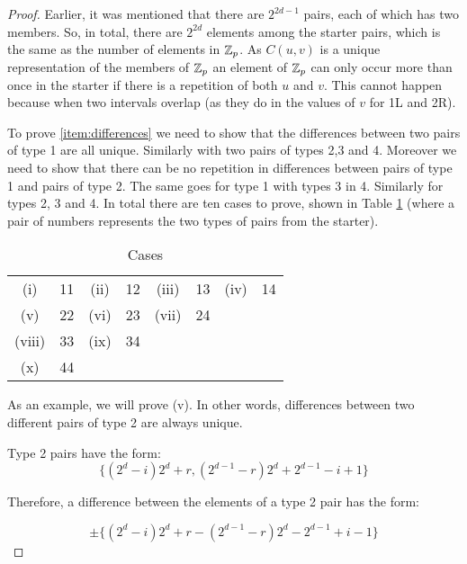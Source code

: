 \begin{proof}
Earlier, it was mentioned that there are $2^{2d - 1}$ pairs, each of which has two members.
So, in total, there are $2^{2d}$ elements among the starter pairs, which is the same as the number of elements in $\mathbb{Z}_{p}$.
As $C(u, v)$ is a unique representation of the members of $\mathbb{Z}_{p}$ an element of $\mathbb{Z}_{p}$ can only occur more than once in the starter if there is a repetition of both $u$ and $v$.
This cannot happen because when two intervals overlap (as they do in the values of $v$ for 1L and 2R).

To prove \ref{item:differences} we need to show that the differences between two pairs of type 1 are all unique.
Similarly with two pairs of types 2,3 and 4.
Moreover we need to show that there can be no repetition in differences between pairs of type 1 and pairs of type 2.
The same goes for type 1 with types 3 in 4.
Similarly for types 2, 3 and 4.
In total there are ten cases to prove, shown in Table \ref{tab:cases} (where a pair of numbers represents the two types of pairs from the starter).

\begin{table}[h!]
  \begin{center}
    \begin{tabular}{cccccccc}
      (i)    & 11 & (ii) & 12 & (iii) & 13 & (iv) & 14 \\
      (v)    & 22 & (vi) & 23 & (vii) & 24 &      &    \\
      (viii) & 33 & (ix) & 34 &       &    &      &    \\
      (x)    & 44 &      &    &       &    &      &    
    \end{tabular}
  \end{center}
  \caption{Cases}
  \label{tab:cases}
\end{table}

As an example, we will prove (v).
In other words, differences between two different pairs of type 2 are always unique.

Type 2 pairs have the form:
\begin{equation*}
\{(2^d - i)2^d + r, (2^{d - 1} - r)2^d + 2^{d - 1} - i + 1\}
\end{equation*}

Therefore, a difference between the elements of a type 2 pair has the form:

\begin{equation*}
  \pm \{(2^d - i)2^d + r - (2^{d - 1} - r)2^d - 2^{d - 1} + i - 1\}
\end{equation*}


\end{proof}
